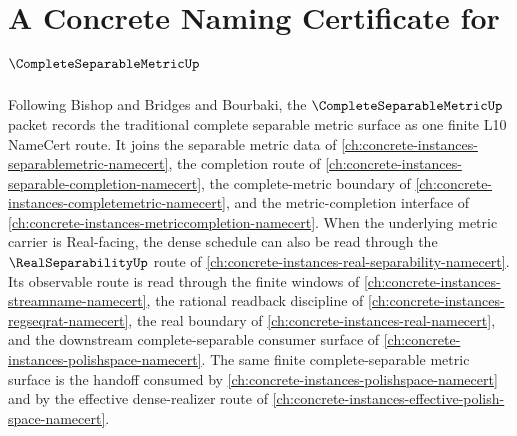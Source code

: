 \chapter{A Concrete Naming Certificate for $\CompleteSeparableMetricUp$}
\label{ch:concrete-instances-complete-separable-metric-namecert}

Following Bishop and Bridges and Bourbaki, the $\CompleteSeparableMetricUp$ packet records the traditional complete separable metric surface as one finite L10 NameCert route. It joins the separable metric data of \autoref{ch:concrete-instances-separablemetric-namecert}, the completion route of \autoref{ch:concrete-instances-separable-completion-namecert}, the complete-metric boundary of \autoref{ch:concrete-instances-completemetric-namecert}, and the metric-completion interface of \autoref{ch:concrete-instances-metriccompletion-namecert}. When the underlying metric carrier is Real-facing, the dense schedule can also be read through the $\RealSeparabilityUp$ route of \autoref{ch:concrete-instances-real-separability-namecert}. Its observable route is read through the finite windows of \autoref{ch:concrete-instances-streamname-namecert}, the rational readback discipline of \autoref{ch:concrete-instances-regseqrat-namecert}, the real boundary of \autoref{ch:concrete-instances-real-namecert}, and the downstream complete-separable consumer surface of \autoref{ch:concrete-instances-polishspace-namecert}. The same finite complete-separable metric surface is the handoff consumed by \autoref{ch:concrete-instances-polishspace-namecert} and by the effective dense-realizer route of \autoref{ch:concrete-instances-effective-polish-space-namecert}.

